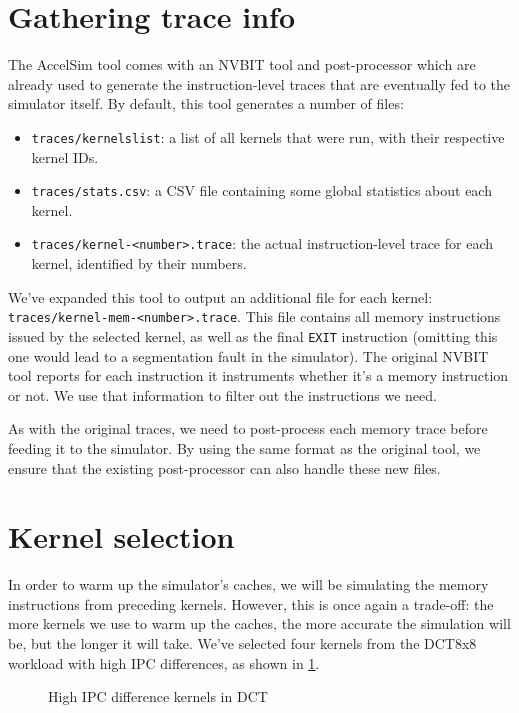 \section{Gathering trace info}\label{sec:trace-info}
The AccelSim\cite{accelsim} tool comes with an NVBIT\cite{nvbit} tool and post-processor which are already used to generate the instruction-level traces that are eventually fed to the simulator itself.
By default, this tool generates a number of files:
\begin{itemize}
    \item \verb|traces/kernelslist|: a list of all kernels that were run, with their respective kernel IDs.
    \item \verb|traces/stats.csv|: a CSV file containing some global statistics about each kernel.
    \item \verb|traces/kernel-<number>.trace|: the actual instruction-level trace for each kernel, identified by their numbers.
\end{itemize}

We've expanded this tool to output an additional file for each kernel: \verb|traces/kernel-mem-<number>.trace|.
This file contains all memory instructions issued by the selected kernel, as well as the final \verb|EXIT| instruction (omitting this one would lead to a segmentation fault in the simulator).
The original NVBIT tool reports for each instruction it instruments whether it's a memory instruction or not.
We use that information to filter out the instructions we need.

As with the original traces, we need to post-process each memory trace before feeding it to the simulator.
By using the same format as the original tool, we ensure that the existing post-processor can also handle these new files.

\FloatBarrier
\section{Kernel selection}\label{sec:kernel-selection}
In order to warm up the simulator's caches, we will be simulating the memory instructions from preceding kernels.
However, this is once again a trade-off: the more kernels we use to warm up the caches, the more accurate the simulation will be, but the longer it will take.
We've selected four kernels from the DCT8x8 workload with high IPC differences, as shown in \cref{fig:dct_kernels}.

\begin{figure}
    \centering
    
    \caption{High IPC difference kernels in DCT}
    \label{fig:dct_kernels}
\end{figure}

